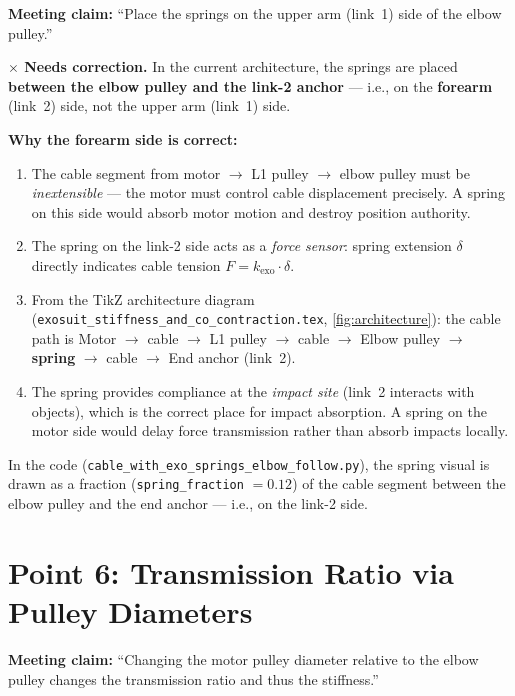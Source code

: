 \documentclass[11pt, a4paper]{article}
\newenvironment{incorrect}{%
  \begin{mdframed}[backgroundcolor=red!8, linecolor=red!60!black]%
  \textbf{\color{red!60!black}$\boldsymbol{\times}$\; Needs correction.}\;}{\end{mdframed}}
\begin{document}
\noindent
\textbf{Meeting claim:} ``Place the springs on the upper arm (link~1) side
of the elbow pulley.''

\begin{incorrect}
In the current architecture, the springs are placed \textbf{between the
elbow pulley and the link-2 anchor} --- i.e., on the \textbf{forearm}
(link~2) side, not the upper arm (link~1) side.

\medskip\noindent
\textbf{Why the forearm side is correct:}
\begin{enumerate}[nosep]
  \item The cable segment from motor $\to$ L1 pulley $\to$ elbow pulley must
    be \emph{inextensible} --- the motor must control cable displacement
    precisely.  A spring on this side would absorb motor motion and destroy
    position authority.
  \item The spring on the link-2 side acts as a \emph{force sensor}: spring
    extension $\delta$ directly indicates cable tension
    $F = k_{\text{exo}} \cdot \delta$.
  \item From the TikZ architecture diagram
    (\texttt{exosuit\_stiffness\_and\_co\_contraction.tex},
    \cref{fig:architecture}): the cable path is
    Motor $\to$ cable $\to$ L1 pulley $\to$ cable $\to$ Elbow pulley
    $\to$ \textbf{spring} $\to$ cable $\to$ End anchor (link~2).
  \item The spring provides compliance at the \emph{impact site} (link~2
    interacts with objects), which is the correct place for impact
    absorption.  A spring on the motor side would delay force transmission
    rather than absorb impacts locally.
\end{enumerate}

\medskip\noindent
In the code (\texttt{cable\_with\_exo\_springs\_elbow\_follow.py}), the
spring visual is drawn as a fraction (\texttt{spring\_fraction} $= 0.12$)
of the cable segment between the elbow pulley and the end anchor --- i.e.,
on the link-2 side.
\end{incorrect}


\section{Point 6: Transmission Ratio via Pulley Diameters}
\label{sec:point6}

\noindent
\textbf{Meeting claim:} ``Changing the motor pulley diameter relative to the
elbow pulley changes the transmission ratio and thus the stiffness.''
\end{document}
